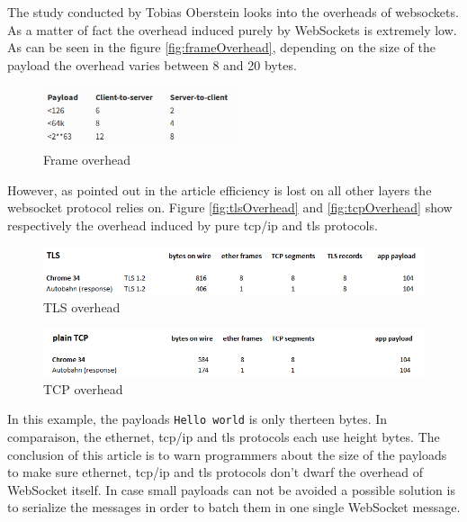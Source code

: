 The study conducted by Tobias Oberstein \citep{Reference30} looks into the
overheads of websockets. As a matter of fact the overhead induced purely by
WebSockets is extremely low. As can be seen in the figure
\ref{fig:frameOverhead}, depending on the size of the payload the overhead
varies between 8 and 20 bytes.\\

\begin{figure}[H]
\centering
\includegraphics[width=0.5\textwidth]{./Figures/frame_overhead.png}
\caption[frameOverhead]{Frame overhead \citep{Reference30}}
\label{fig:frame_overhead}
\end{figure}

However, as pointed out in the article efficiency is lost on all other layers
the websocket protocol relies on. Figure \ref{fig:tlsOverhead} and
\ref{fig:tcpOverhead} show respectively the overhead induced by pure tcp/ip
and tls protocols.\\

\begin{figure}[H]
\centering
\includegraphics[width=\textwidth]{./Figures/tls_overhead.png}
\caption[tlsOverhead]{TLS overhead \citep{Reference30}}
\label{fig:tls_overhead}
\end{figure}

\begin{figure}[H]
\centering
\includegraphics[width=\textwidth]{./Figures/tcp_overhead.png}
\caption[tcpOverhead]{TCP overhead \citep{Reference30}}
\label{fig:tcp_overhead}
\end{figure}



In this example, the payloads \texttt{Hello world} is only therteen bytes. In
comparaison, the ethernet, tcp/ip and tls protocols each use height bytes. The
conclusion of this article is to warn programmers about the size of the
payloads to make sure ethernet, tcp/ip and tls protocols don't dwarf the
overhead of WebSocket itself.  In case small payloads can not be avoided a
possible solution is to serialize the messages in order to batch them in one
single WebSocket message.\\


